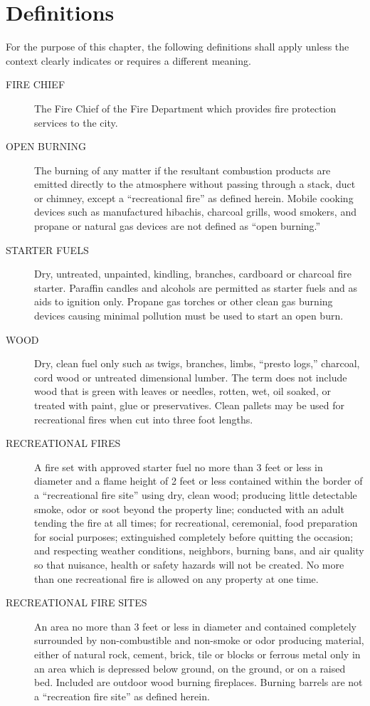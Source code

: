 \section{Definitions}
For the purpose of this chapter, the following definitions shall apply unless the context clearly indicates or requires a different meaning.
\begin{description}
    \item[FIRE CHIEF] The Fire Chief of the Fire Department which provides fire protection services to the city.
    \item[OPEN BURNING] The burning of any matter if the resultant combustion products are emitted directly to the atmosphere without passing through a stack, duct or chimney, except a “recreational fire” as defined herein. Mobile cooking devices such as manufactured hibachis, charcoal grills, wood smokers, and propane or natural gas devices are not defined as “open burning.”  
    \item[STARTER FUELS] Dry, untreated, unpainted, kindling, branches, cardboard or charcoal fire starter. Paraffin candles and alcohols are permitted as starter fuels and as aids to ignition only.  Propane gas torches or other clean gas burning devices causing minimal pollution must be used to start an open burn.
    \item[WOOD] Dry, clean fuel only such as twigs, branches, limbs, “presto logs,” charcoal, cord wood or untreated dimensional lumber. The term does not include wood that is green with leaves or needles, rotten, wet, oil soaked, or treated with paint, glue or preservatives. Clean pallets may be used for recreational fires when cut into three foot lengths.
    \item[RECREATIONAL FIRES] A fire set with approved starter fuel no more than 3 feet or less in diameter and a flame height of 2 feet or less contained within the border of a “recreational fire site” using dry, clean wood; producing little detectable smoke, odor or soot beyond the property line; conducted with an adult tending the fire at all times; for recreational, ceremonial, food preparation for social purposes; extinguished completely before quitting the occasion; and respecting weather conditions, neighbors, burning bans, and air quality so that nuisance, health or safety hazards will not be created. No more than one recreational fire is allowed on any property at one time.
    \item[RECREATIONAL FIRE SITES] An area no more than 3 feet or less in diameter and contained completely surrounded by non-combustible and non-smoke or odor producing material, either of natural rock, cement, brick, tile or blocks or ferrous metal only in an area which is depressed below ground, on the ground, or on a raised bed. Included are outdoor wood burning fireplaces. Burning barrels are not a “recreation fire site” as defined herein.
\end{description}

